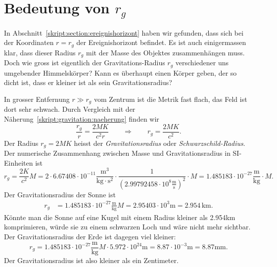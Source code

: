 \section{Bedeutung von $r_g$%
\label{skript:schwarzschild:rg}}
In Abschnitt~\ref{skript:section:ereignishorizont} haben wir gefunden,
dass sich bei der Koordinaten $r=r_g$ der Ereignishorizont befindet.
Es ist auch einigermassen klar, dass dieser Radius $r_g$ mit der
Masse des Objektes zusammenhängen muss.
Doch wie gross ist eigentlich der Gravitations-Radius $r_g$ verschiedener
uns umgebender Himmelskörper? Kann es überhaupt einen Körper geben, der
so dicht ist, dass er kleiner ist als sein Gravitationsradius?

In grosser Entfernung $r \gg r_g$ vom Zentrum ist die Metrik fast flach,
das Feld ist dort sehr schwach.
Durch Vergleich mit der Näherung~\eqref{skript:gravitation:naeherung}
finden wir
\[
\frac{r_g}{r} = \frac{2MK}{c^2r}
\qquad\Rightarrow\qquad
r_g=\frac{2MK}{c^2}.
\]
Der Radius $r_g=2MK$ heisst der {\em Gravitationsradius} oder 
%
{\em Schwarzschild-Radius}.
%
Der numerische Zusammenhang zwischen Masse und Gravitationsradius
in SI-Einheiten ist
\[
r_g = \frac{2K}{c^2}M
=
2\cdot 6.67408\cdot10^{-11}
\frac{\text{m}^3}{\text{kg}\cdot\text{s}^2}
\cdot
\frac1{(2.99792458\cdot 10^{8}\frac{\text{m}}{\text{s}})^2}\cdot M
=
1.485183\cdot 10^{-27}\frac{\text{m}}{\text{kg}}\cdot M.
\]
Der Gravitationsradius der Sonne ist 
\begin{align*}
r_g
&=
1.485183\cdot 10^{-27}\frac{\text{m}}{\text{kg}}M
=
2.95403\cdot 10^{3}\text{m}
=
2.954\,\text{km}.
\end{align*}
Könnte man die Sonne auf eine Kugel mit einem Radius kleiner als 2.954km
komprimieren, würde sie zu einem schwarzen Loch und wäre nicht mehr
sichtbar.
Der Gravitationsradius der Erde ist dagegen viel kleiner:
\[
r_g
=
1.485183\cdot 10^{-27}\frac{\text{m}}{\text{kg}}M
\cdot
5.972\cdot 10^{24}\text{m}
=
8.87\cdot 10^{-3}\text{m}
=
8.87\text{mm}.
\]
Der Gravitationsradius ist also kleiner als ein Zentimeter.





